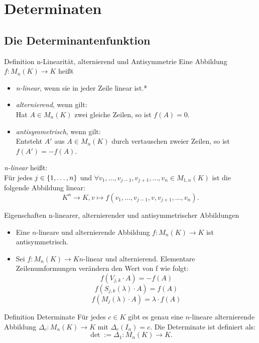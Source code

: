 \documentclass[main.tex]{subfiles}
\begin{document}
\section*{Determinaten}

\subsection*{Die Determinantenfunktion}

\begin{karte}{Definition n-Linearität, alternierend und Antisymmetrie}
    Eine Abbildung \(f: M_n(K) \rightarrow K\) heißt
    \begin{itemize}
        \item \textit{n-linear}, wenn sie in jeder Zeile linear ist.*
        \item \textit{alternierend}, wenn gilt: \\
        Hat \(A \in M_n(K)\) zwei gleiche Zeilen, so ist  \(f(A) = 0\).
       \item \textit{antisymmetrisch}, wenn gilt:\\
        Entsteht \(A'\) aus \(A \in M_n(K)\) durch vertauschen zweier
        Zeilen, so ist \(f(A') = -f(A)\).
    \end{itemize}
    \textit{n-linear} heißt: \\
    Für jedes \(j \in \{1,\ldots,n\}\) und \(\forall v_1, 
    \ldots,v_{j-1},v_{j+1},\ldots,v_n \in M_{1,n}(K)\) ist 
    die \\ 
    folgende Abbildung linear:
    \[K^n \rightarrow K, v \mapsto f(v_1, \ldots,v_{j-1},v,v_{j+1},\ldots,v_n).\]
\end{karte}
\begin{karte}{Eigenschaften n-linearer, alternierender und antisymmetrischer Abbildungen}
    \begin{itemize}
        \item Eine \(n\)-lineare und alternierende Abbildung 
        \(f: M_n(K) \rightarrow K\) ist antisymmetrisch.
        \item Sei \(f: M_n(K) \rightarrow K n\)-linear und alternierend.
        Elementare Zeilenumformungen verändern den Wert von f wie folgt: 
        \[f(V_{j,k} \cdot A) = -f(A)\]
        \[f(S_{j,k}(\lambda) \cdot A) = f(A)\]
        \[f(M_j(\lambda) \cdot A) = \lambda \cdot f(A)\]
    \end{itemize}
\end{karte}
\begin{karte}{Definition Determinate}
    Für jedes \(c \in K\) gibt es genau eine \(n\)-lineare alternierende
    Abbildung \(\Delta_c: M_n(K) \rightarrow K\) mit \(\Delta_c(I_n) = c \).
    Die Determinate ist definiert als: 
    \[\det := \Delta_1: M_n(K) \rightarrow K.\]
\end{karte}
\end{document}
